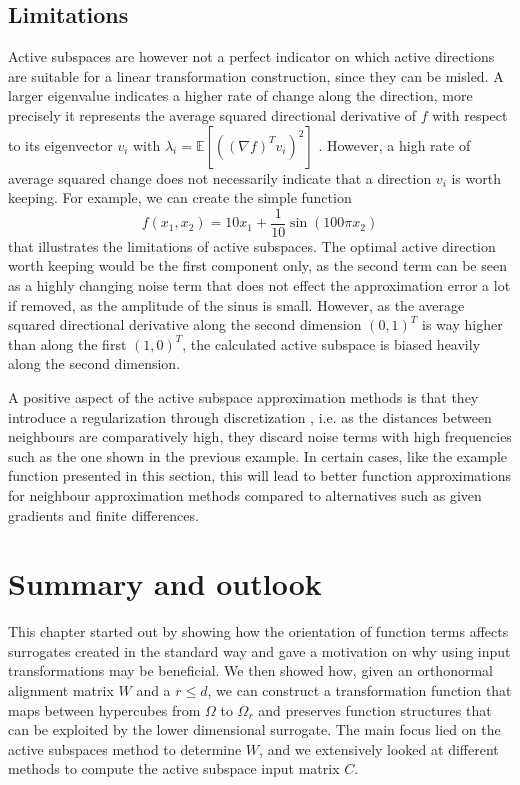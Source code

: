 \documentclass[
  a4paper,  %
  twoside,  %
  bibliography=totoc,
  headsepline,
  cleardoublepage=empty,
  parskip=half,
  draft=false
]{scrbook}
\begin{document}
\subsection{Limitations}

Active subspaces are however not a perfect indicator on which active directions are suitable for a linear transformation construction, since they can be misled.
A larger eigenvalue indicates a higher rate of change along the direction, more precisely it represents the average squared directional derivative of $f$ with respect to its eigenvector $v_i$ with $\lambda_i=\mathds{E}[((\nabla f)^T v_i)^2]$ \cite{CG14}.
However, a high rate of average squared change does not necessarily indicate that a direction $v_i$ is worth keeping.
For example, we can create the simple function
\begin{equation}
f(x_1, x_2)=10x_1 + \frac{1}{10} \sin(100 \pi x_2)
\end{equation}
that illustrates the limitations of active subspaces.
The optimal active direction worth keeping would be the first component only, as the second term can be seen as a highly changing noise term that does not effect the approximation error a lot if removed, as the amplitude of the sinus is small.
However, as the average squared directional derivative along the second dimension $(0,1)^T$ is way higher than along the first $(1,0)^T$, the calculated active subspace is biased heavily along the second dimension.

A positive aspect of the active subspace approximation methods is that they introduce a regularization through discretization \cite{}, i.e. as the distances between neighbours are comparatively high, they discard noise terms with high frequencies such as the one shown in the previous example.
In certain cases, like the example function presented in this section, this will lead to better function approximations for neighbour approximation methods compared to alternatives such as given gradients and finite differences.

\section{Summary and outlook}

This chapter started out by showing how the orientation of function terms affects surrogates created in the standard way and gave a motivation on why using input transformations may be beneficial.
We then showed how, given an orthonormal alignment matrix $W$ and a $r \leq d$, we can construct a transformation function that maps between hypercubes from $\Omega$ to $\Omega_r$ and preserves function structures that can be exploited by the lower dimensional surrogate.
The main focus lied on the active subspaces method to determine $W$, and we extensively looked at different methods to compute the active subspace input matrix $C$.
\end{document}
